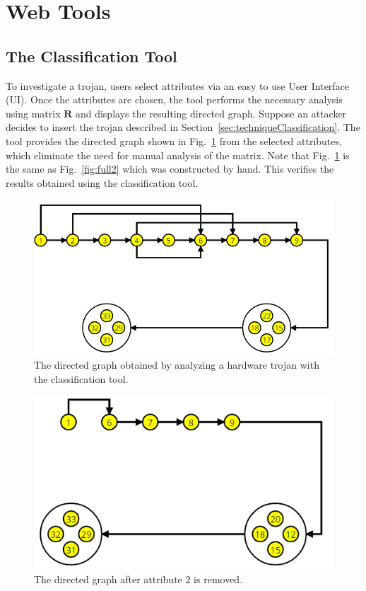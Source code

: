 \label{chapter:webSite}
\section{Web Tools}
\subsection{The Classification Tool} \label{sec:toolClassification}
To investigate a trojan, users select attributes via an easy to use User Interface (UI).
Once the attributes are chosen, the tool performs the necessary analysis using matrix $\mathbf{R}$ and displays the resulting directed graph.
Suppose an attacker decides to insert the trojan described in Section~\ref{sec:techniqueClassification}. %
The tool provides the directed graph shown in Fig.~\ref{fig:visualRepresentaion} from the selected attributes, which eliminate the
need for manual analysis of the matrix.
Note that Fig.~\ref{fig:visualRepresentaion} is the same as Fig.~\ref{fig:full2} which was constructed by hand.
This verifies the results obtained using the classification tool.
\begin{figure}[h]
	\centering
	\includegraphics[width=0.9\linewidth]{figures/visualRepresentaion}
	\caption{The directed graph obtained by analyzing a hardware trojan with the classification tool.}
	\label{fig:visualRepresentaion}
\end{figure}
\begin{figure}[h]
	\centering
	\includegraphics[width=0.75\linewidth]{figures/visualRepresentaion2}
	\caption{The directed graph after attribute $2$ is removed.}
	\label{fig:visualRepresentaion2}
\end{figure}

